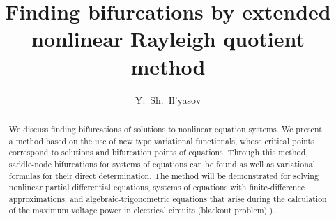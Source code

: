 \begin{englishtitle} %
\title{Finding bifurcations by extended nonlinear Rayleigh quotient method}
\author{Y.~Sh.~Il'yasov }

\maketitle

\begin{abstract}
We discuss finding bifurcations of solutions to nonlinear equation systems. We present a method based on the use of new type variational functionals, whose critical points correspond to solutions and bifurcation points of equations. Through this method, saddle-node bifurcations for systems of equations can be found as well as variational formulas for their direct determination. 
The method will be demonstrated for solving nonlinear partial differential equations, systems of equations with finite-difference approximations, and algebraic-trigonometric equations that arise during the calculation of the maximum voltage power in electrical circuits (blackout problem).).
\end{abstract}
\end{englishtitle}


\iffalse
%
%


\documentclass[12pt]{llncs}  


\usepackage{iftex}

\ifPDFTeX
\usepackage[T2A]{fontenc}
\usepackage[utf8]{inputenc} %
\usepackage[english,russian]{babel}
\fi

\usepackage{todonotes} 

\usepackage[russian]{nla}


